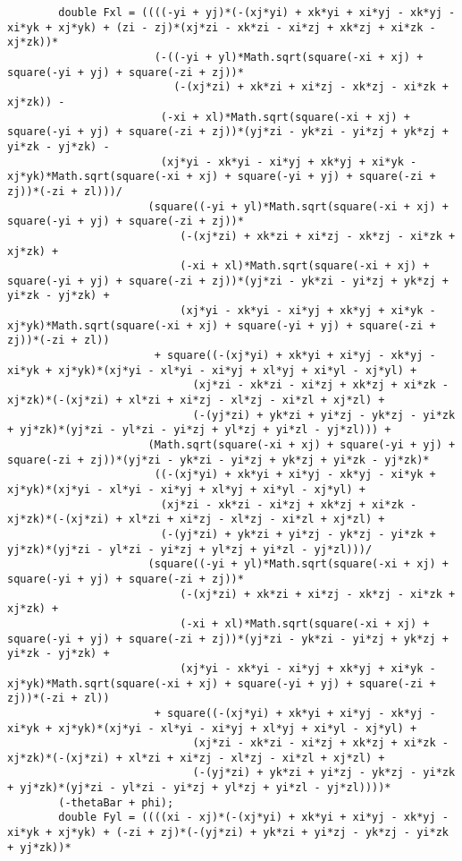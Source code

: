 \begin{lstlisting}
		double Fxl = ((((-yi + yj)*(-(xj*yi) + xk*yi + xi*yj - xk*yj - xi*yk + xj*yk) + (zi - zj)*(xj*zi - xk*zi - xi*zj + xk*zj + xi*zk - xj*zk))*
					   (-((-yi + yl)*Math.sqrt(square(-xi + xj) + square(-yi + yj) + square(-zi + zj))*
						  (-(xj*zi) + xk*zi + xi*zj - xk*zj - xi*zk + xj*zk)) - 
						(-xi + xl)*Math.sqrt(square(-xi + xj) + square(-yi + yj) + square(-zi + zj))*(yj*zi - yk*zi - yi*zj + yk*zj + yi*zk - yj*zk) - 
						(xj*yi - xk*yi - xi*yj + xk*yj + xi*yk - xj*yk)*Math.sqrt(square(-xi + xj) + square(-yi + yj) + square(-zi + zj))*(-zi + zl)))/
					  (square((-yi + yl)*Math.sqrt(square(-xi + xj) + square(-yi + yj) + square(-zi + zj))*
						   (-(xj*zi) + xk*zi + xi*zj - xk*zj - xi*zk + xj*zk) + 
						   (-xi + xl)*Math.sqrt(square(-xi + xj) + square(-yi + yj) + square(-zi + zj))*(yj*zi - yk*zi - yi*zj + yk*zj + yi*zk - yj*zk) + 
						   (xj*yi - xk*yi - xi*yj + xk*yj + xi*yk - xj*yk)*Math.sqrt(square(-xi + xj) + square(-yi + yj) + square(-zi + zj))*(-zi + zl))
					   + square((-(xj*yi) + xk*yi + xi*yj - xk*yj - xi*yk + xj*yk)*(xj*yi - xl*yi - xi*yj + xl*yj + xi*yl - xj*yl) + 
							 (xj*zi - xk*zi - xi*zj + xk*zj + xi*zk - xj*zk)*(-(xj*zi) + xl*zi + xi*zj - xl*zj - xi*zl + xj*zl) + 
							 (-(yj*zi) + yk*zi + yi*zj - yk*zj - yi*zk + yj*zk)*(yj*zi - yl*zi - yi*zj + yl*zj + yi*zl - yj*zl))) + 
					  (Math.sqrt(square(-xi + xj) + square(-yi + yj) + square(-zi + zj))*(yj*zi - yk*zi - yi*zj + yk*zj + yi*zk - yj*zk)*
					   ((-(xj*yi) + xk*yi + xi*yj - xk*yj - xi*yk + xj*yk)*(xj*yi - xl*yi - xi*yj + xl*yj + xi*yl - xj*yl) + 
						(xj*zi - xk*zi - xi*zj + xk*zj + xi*zk - xj*zk)*(-(xj*zi) + xl*zi + xi*zj - xl*zj - xi*zl + xj*zl) + 
						(-(yj*zi) + yk*zi + yi*zj - yk*zj - yi*zk + yj*zk)*(yj*zi - yl*zi - yi*zj + yl*zj + yi*zl - yj*zl)))/
					  (square((-yi + yl)*Math.sqrt(square(-xi + xj) + square(-yi + yj) + square(-zi + zj))*
						   (-(xj*zi) + xk*zi + xi*zj - xk*zj - xi*zk + xj*zk) + 
						   (-xi + xl)*Math.sqrt(square(-xi + xj) + square(-yi + yj) + square(-zi + zj))*(yj*zi - yk*zi - yi*zj + yk*zj + yi*zk - yj*zk) + 
						   (xj*yi - xk*yi - xi*yj + xk*yj + xi*yk - xj*yk)*Math.sqrt(square(-xi + xj) + square(-yi + yj) + square(-zi + zj))*(-zi + zl))
					   + square((-(xj*yi) + xk*yi + xi*yj - xk*yj - xi*yk + xj*yk)*(xj*yi - xl*yi - xi*yj + xl*yj + xi*yl - xj*yl) + 
							 (xj*zi - xk*zi - xi*zj + xk*zj + xi*zk - xj*zk)*(-(xj*zi) + xl*zi + xi*zj - xl*zj - xi*zl + xj*zl) + 
							 (-(yj*zi) + yk*zi + yi*zj - yk*zj - yi*zk + yj*zk)*(yj*zi - yl*zi - yi*zj + yl*zj + yi*zl - yj*zl))))*
		(-thetaBar + phi);
		double Fyl = ((((xi - xj)*(-(xj*yi) + xk*yi + xi*yj - xk*yj - xi*yk + xj*yk) + (-zi + zj)*(-(yj*zi) + yk*zi + yi*zj - yk*zj - yi*zk + yj*zk))*

\end{lstlisting}
